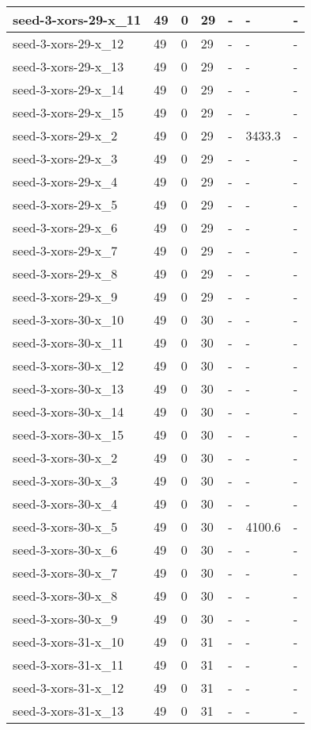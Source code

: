 \begin{scriptsize}
\begin{longtable}{|p{5cm}|l|l|l|l|l|l|}
seed-3-xors-29-x\_11&49&0&29&-&-&- \\ \hline 
seed-3-xors-29-x\_12&49&0&29&-&-&- \\ \hline 
seed-3-xors-29-x\_13&49&0&29&-&-&- \\ \hline 
seed-3-xors-29-x\_14&49&0&29&-&-&- \\ \hline 
seed-3-xors-29-x\_15&49&0&29&-&-&- \\ \hline 
seed-3-xors-29-x\_2&49&0&29&-&3433.3&- \\ \hline 
seed-3-xors-29-x\_3&49&0&29&-&-&- \\ \hline 
seed-3-xors-29-x\_4&49&0&29&-&-&- \\ \hline 
seed-3-xors-29-x\_5&49&0&29&-&-&- \\ \hline 
seed-3-xors-29-x\_6&49&0&29&-&-&- \\ \hline 
seed-3-xors-29-x\_7&49&0&29&-&-&- \\ \hline 
seed-3-xors-29-x\_8&49&0&29&-&-&- \\ \hline 
seed-3-xors-29-x\_9&49&0&29&-&-&- \\ \hline 
seed-3-xors-30-x\_10&49&0&30&-&-&- \\ \hline 
seed-3-xors-30-x\_11&49&0&30&-&-&- \\ \hline 
seed-3-xors-30-x\_12&49&0&30&-&-&- \\ \hline 
seed-3-xors-30-x\_13&49&0&30&-&-&- \\ \hline 
seed-3-xors-30-x\_14&49&0&30&-&-&- \\ \hline 
seed-3-xors-30-x\_15&49&0&30&-&-&- \\ \hline 
seed-3-xors-30-x\_2&49&0&30&-&-&- \\ \hline 
seed-3-xors-30-x\_3&49&0&30&-&-&- \\ \hline 
seed-3-xors-30-x\_4&49&0&30&-&-&- \\ \hline 
seed-3-xors-30-x\_5&49&0&30&-&4100.6&- \\ \hline 
seed-3-xors-30-x\_6&49&0&30&-&-&- \\ \hline 
seed-3-xors-30-x\_7&49&0&30&-&-&- \\ \hline 
seed-3-xors-30-x\_8&49&0&30&-&-&- \\ \hline 
seed-3-xors-30-x\_9&49&0&30&-&-&- \\ \hline 
seed-3-xors-31-x\_10&49&0&31&-&-&- \\ \hline 
seed-3-xors-31-x\_11&49&0&31&-&-&- \\ \hline 
seed-3-xors-31-x\_12&49&0&31&-&-&- \\ \hline 
seed-3-xors-31-x\_13&49&0&31&-&-&- \\ \hline 

\end{longtable}
\end{scriptsize}

